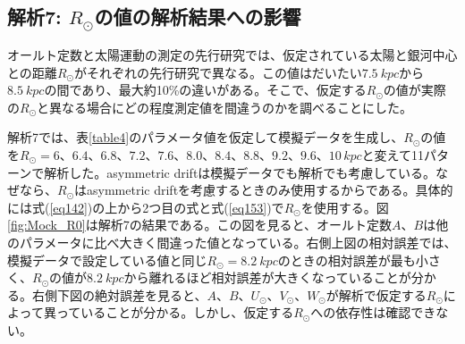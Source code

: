 
\subsection{解析7: $R_{\odot}$の値の解析結果への影響}
オールト定数と太陽運動の測定の先行研究では、仮定されている太陽と銀河中心との距離$R_{\odot}$がそれぞれの先行研究で異なる。この値はだいたい$\SI{7.5}{kpc}$から$\SI{8.5}{kpc}$の間であり、最大約10\%の違いがある。そこで、仮定する$R_{\odot}$の値が実際の$R_{\odot}$と異なる場合にどの程度測定値を間違うのかを調べることにした。

解析7では、表\ref{table4}のパラメータ値を仮定して模擬データを生成し、$R_{\odot}$の値を$R_{\odot} = 6、6.4、6.8、7.2、7.6、8.0、8.4、8.8、9.2、9.6、10\,\si{kpc}$と変えて11パターンで解析した。asymmetric driftは模擬データでも解析でも考慮している。なぜなら、$R_{\odot}$はasymmetric driftを考慮するときのみ使用するからである。具体的には式(\ref{eq142})の上から2つ目の式と式(\ref{eq153})で$R_{\odot}$を使用する。図\ref{fig:Mock_R0}は解析7の結果である。この図を見ると、オールト定数$A、B$は他のパラメータに比べ大きく間違った値となっている。右側上図の相対誤差では、模擬データで設定している値と同じ$R_{\odot}=\SI{8.2}{kpc}$のときの相対誤差が最も小さく、$R_{\odot}$の値が$\SI{8.2}{kpc}$から離れるほど相対誤差が大きくなっていることが分かる。右側下図の絶対誤差を見ると、$A、B、U_{\odot}、V_{\odot}、W_{\odot}$が解析で仮定する$R_{\odot}$によって異っていることが分かる。しかし、仮定する$R_{\odot}$への依存性は確認できない。

